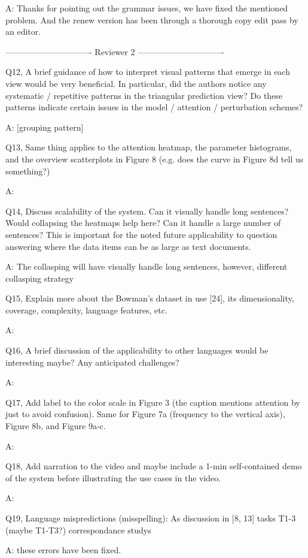 A: Thanks for pointing out the grammar issues, we have fixed the mentioned problem. And the renew version has been through a thorough copy edit pass by an editor.

------------------------------- Reviewer 2 -------------------------------

Q12, A brief guidance of how to interpret visual patterns that emerge in each view would be very beneficial. In particular, did the authors notice any systematic / repetitive patterns in the triangular prediction view? Do these patterns indicate certain issues in the model / attention / perturbation schemes?

A: [grouping pattern]

Q13, Same thing applies to the attention heatmap, the parameter histograms, and the overview scatterplots in Figure 8 (e.g. does the curve in Figure 8d tell us something?)

A:

Q14, Discuss scalability of the system. Can it visually handle long sentences? Would collapsing the heatmaps help here? Can it handle a large number of sentences? This is important for the noted future applicability to question answering where the data items can be as large as text documents.

A: The collasping will have visually handle long sentences, however, different collasping strategy

Q15, Explain more about the Bowman's dataset in use [24], its dimensionality, coverage, complexity, language features, etc.

A:

Q16, A brief discussion of the applicability to other languages would be interesting maybe? Any anticipated challenges?

A:

Q17, Add label to the color scale in Figure 3 (the caption mentions attention by just to avoid confusion). Same for Figure 7a (frequency to the vertical axis), Figure 8b, and Figure 9a-c.

A:

Q18, Add narration to the video and maybe include a 1-min self-contained demo of the system before illustrating the use cases in the video.

A:

Q19, Language mispredictions (misspelling):
As discussion in [8, 13]
tasks T1-3 (maybe T1-T3?)
correspondance
studys

A: these errors have been fixed.

